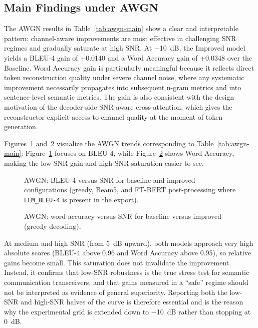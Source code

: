 \subsection{Main Findings under AWGN}

The AWGN results in Table~\ref{tab:awgn-main} show a clear and interpretable pattern: channel-aware improvements are most effective in challenging SNR regimes and gradually saturate at high SNR. At \SI{-10}{dB}, the Improved model yields a BLEU-4 gain of +0.0140 and a Word Accuracy gain of +0.0348 over the Baseline. Word Accuracy gain is particularly meaningful because it reflects direct token reconstruction quality under severe channel noise, where any systematic improvement necessarily propagates into subsequent n-gram metrics and into sentence-level semantic metrics. The gain is also consistent with the design motivation of the decoder-side SNR-aware cross-attention, which gives the reconstructor explicit access to channel quality at the moment of token generation.

Figures~\ref{fig:bleu_awgn} and~\ref{fig:wordacc_awgn} visualize the AWGN trends corresponding to Table~\ref{tab:awgn-main}: Figure~\ref{fig:bleu_awgn} focuses on BLEU-$4$, while Figure~\ref{fig:wordacc_awgn} shows Word Accuracy, making the low-SNR gain and high-SNR saturation easier to see.
\begin{figure}[!htb]
\centering
{}
\caption{AWGN: BLEU-$4$ versus SNR for baseline and improved configurations (greedy, Beam5, and FT-BERT post-processing where \texttt{LLM\_BLEU-4} is present in the export).}
\label{fig:bleu_awgn}
\end{figure}
\begin{figure}[!htb]
\centering
{}
\caption{AWGN: word accuracy versus SNR for baseline versus improved (greedy decoding).}
\label{fig:wordacc_awgn}
\end{figure}
\FloatBarrier

At medium and high SNR (from \SI{5}{dB} upward), both models approach very high absolute scores (BLEU-4 above 0.96 and Word Accuracy above 0.95), so relative gains become small. This saturation does not invalidate the improvement. Instead, it confirms that low-SNR robustness is the true stress test for semantic communication transceivers, and that gains measured in a ``safe'' regime should not be interpreted as evidence of general superiority. Reporting both the low-SNR and high-SNR halves of the curve is therefore essential and is the reason why the experimental grid is extended down to \SI{-10}{dB} rather than stopping at \SI{0}{dB}.


